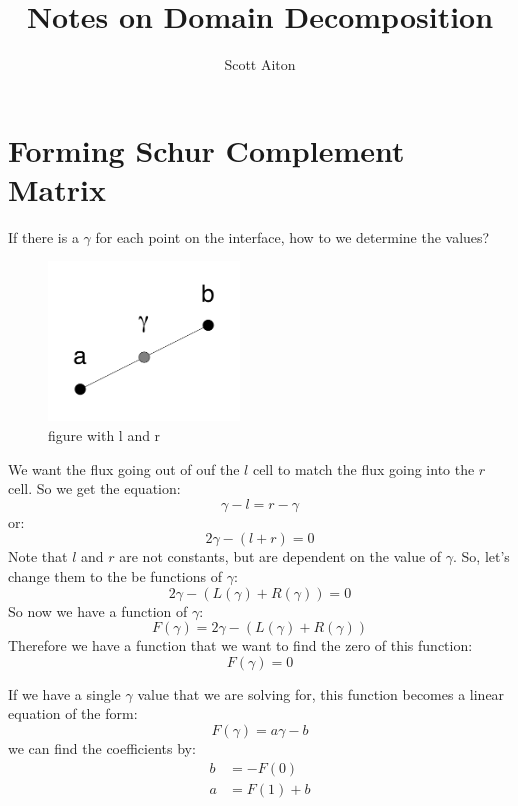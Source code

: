 \documentclass[12pt]{article}
\begin{document}
\title{Notes on Domain Decomposition}
\author{Scott Aiton}
\maketitle

\section{Forming Schur Complement Matrix}

If there is a $\gamma$ for each point on the interface, how to we determine the values?

\begin{figure}[H]
    \centering
    \includegraphics[width=2in]{abgamma.pdf}
    \caption{figure with l and r}
\end{figure}

We want the flux going out of ouf the $l$ cell to match the flux going into the $r$ cell.
So we get the equation:
\begin{equation}
\gamma-l=r-\gamma
\end{equation}
or:
\begin{equation}
2\gamma-(l+r)=0
\end{equation}
Note that $l$ and $r$ are not constants, but are dependent on the value of $\gamma$.
So, let's change them to the be functions of $\gamma$:
\begin{equation}
2\gamma-(L(\gamma)+R(\gamma))=0
\end{equation}
So now we have a function of $\gamma$:
\begin{equation}
F(\gamma)=2\gamma-(L(\gamma)+R(\gamma))
    \label{function}
\end{equation}
Therefore we have a function that we want to find the zero of this function:
\begin{equation}
F(\gamma)=0
\end{equation}

If we have a single $\gamma$ value that we are solving for, this function becomes a linear equation of the form:
\begin{equation}
F(\gamma)=a\gamma-b
\end{equation}
we can find the coefficients by:
\begin{align}
    b&=-F(0)\\
    a&=F(1)+b
\end{align}
\end{document}
